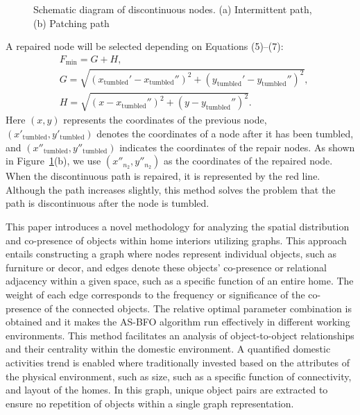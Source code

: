 \documentclass{PDS}%
\theoremstyle{definition}
\begin{document}
\begin{figure}[h!]
\caption{Schematic diagram of discontinuous nodes. (a) Intermittent path, (b) Patching path}
\label{fig:4}
\end{figure}

A repaired node will be selected depending on Equations (5)--(7):
\begin{align}
&F_{\min } = G + H, \label{equ:5}\\
&G = \sqrt {(x_{\text{tumbled}}' - x_{\text{tumbled}}'' )^2 + (y_{\text{tumbled}}' - y_{\text{tumbled}}'' )^2 }, \label{equ:6}\\
&H = \sqrt {(x - x_{\text{tumbled}}'' )^2 + (y - y_{\text{tumbled}}'' )^2}. \label{equ:7}
\end{align}
Here $(x, y)$ represents the coordinates of the previous node, $(x'_{\text{tumbled}}, y'_{\text{tumbled}})$ denotes the coordinates of a node after it has been tumbled, and
$(x''_{\text{tumbled}}, y''_{\text{tumbled}})$ indicates the coordinates of the repair
nodes. As shown in Figure~\ref{fig:4}(b), we use $(x''_{n_2}, y''_{n_2})$ as the
coordinates of the repaired node. When the discontinuous path is repaired, it is
represented by the red line. Although the path increases slightly, this method solves the
problem that the path is discontinuous after the node is tumbled.

This paper introduces a novel methodology for analyzing the spatial distribution and co-presence of
objects within home interiors utilizing graphs. This approach entails constructing a graph where nodes
represent individual objects, such as furniture or decor, and edges denote these objects' co-presence or
relational adjacency within a given space, such as a specific function of an entire home. The weight of
each edge corresponds to the frequency or significance of the co-presence of the connected objects. The relative optimal parameter combination is obtained and it makes the AS-BFO algorithm run effectively in different working environments. This method facilitates an analysis of object-to-object relationships and their centrality within the domestic environment. A quantified domestic activities trend is enabled where traditionally invested based on the
attributes of the physical environment, such as size, such as a
specific function of connectivity, and layout of the homes. In this graph,
unique object pairs are extracted to ensure no repetition of objects
within a single graph representation.
\end{document}
